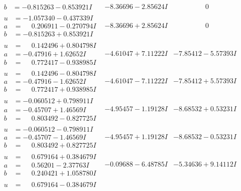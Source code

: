 \documentclass[1p]{elsarticle_modified}
\theoremstyle{definition}
\begin{document}
$$\begin{array}{c|c|c}
\begin{aligned}
b &= -0.815263 - 0.853921 I\end{aligned}
 & -8.36696 - 2.85624 I & \phantom{-0.000000 } 0 \\ \hline\begin{aligned}
u &= -1.057340 - 0.437339 I \\
a &= \phantom{-}0.206911 - 0.270794 I \\
b &= -0.815263 + 0.853921 I\end{aligned}
 & -8.36696 + 2.85624 I & \phantom{-0.000000 } 0 \\ \hline\begin{aligned}
u &= \phantom{-}0.142496 + 0.804798 I \\
a &= -0.47916 + 1.62652 I \\
b &= \phantom{-}0.772417 - 0.938985 I\end{aligned}
 & -4.61047 + 7.11222 I & -7.85412 - 5.57393 I \\ \hline\begin{aligned}
u &= \phantom{-}0.142496 - 0.804798 I \\
a &= -0.47916 - 1.62652 I \\
b &= \phantom{-}0.772417 + 0.938985 I\end{aligned}
 & -4.61047 - 7.11222 I & -7.85412 + 5.57393 I \\ \hline\begin{aligned}
u &= -0.060512 + 0.798911 I \\
a &= -0.45707 + 1.46569 I \\
b &= \phantom{-}0.803492 - 0.827725 I\end{aligned}
 & -4.95457 - 1.19128 I & -8.68532 + 0.53231 I \\ \hline\begin{aligned}
u &= -0.060512 - 0.798911 I \\
a &= -0.45707 - 1.46569 I \\
b &= \phantom{-}0.803492 + 0.827725 I\end{aligned}
 & -4.95457 + 1.19128 I & -8.68532 - 0.53231 I \\ \hline\begin{aligned}
u &= \phantom{-}0.679164 + 0.384679 I \\
a &= \phantom{-}0.56201 - 2.37763 I \\
b &= \phantom{-}0.240421 + 1.058780 I\end{aligned}
 & -0.09688 - 6.48785 I & -5.34636 + 9.14112 I \\ \hline\begin{aligned}
u &= \phantom{-}0.679164 - 0.384679 I \\

\end{aligned}
\end{array}$$
\end{document}
